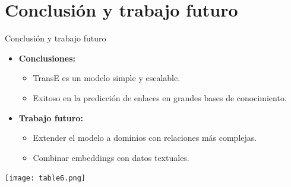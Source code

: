 \documentclass{beamer}
\begin{document}
\section{Conclusión y trabajo futuro}

\begin{frame}{Conclusión y trabajo futuro}
    \begin{itemize}
        \item \textbf{Conclusiones:}
        \begin{itemize}
            \item TransE es un modelo simple y escalable.
            \item Exitoso en la predicción de enlaces en grandes bases de conocimiento.
        \end{itemize}
        \item \textbf{Trabajo futuro:}
        \begin{itemize}
            \item Extender el modelo a dominios con relaciones más complejas.
            \item Combinar embeddings con datos textuales.
        \end{itemize}
    \end{itemize}
    \vspace{0.5cm}
    \centering
    \texttt{[image: table6.png]} %
\end{frame}
\end{document}
